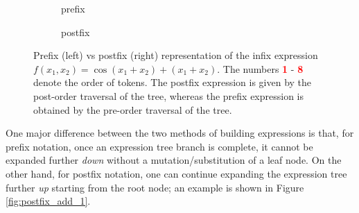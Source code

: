 \documentclass[12pt]{iopart}
\begin{document}
\begin{figure}
    \begin{subfigure}[b]{0.51\textwidth}
        \centering
        \caption{prefix}
        \label{subfig:prefix_tree_example}
    \end{subfigure}
    \hspace{1cm}
    \begin{subfigure}[b]{0.51\textwidth}
        \centering
        \caption{postfix} \label{subfig:postfix_tree_example}
    \end{subfigure}
    \caption{Prefix (left) vs postfix (right) representation of the infix expression $f(x_1, x_2) = \cos(x_1 + x_2) + (x_1 + x_2)$. The numbers \textcolor{red}{\textbf{1}} - \textcolor{red}{\textbf{8}} denote the order of tokens. The postfix expression is given by the post-order traversal of the tree, whereas the prefix expression is obtained by the pre-order traversal of the tree.}
    \label{fig:prefix_vs_postfix}
\end{figure}

\par One major difference between the two methods of building expressions is that, for prefix notation, once an expression tree branch is complete, it cannot be expanded further \emph{down} without a mutation/substitution of a leaf node. On the other hand, for postfix notation, one can continue expanding the expression tree further \emph{up} starting from the root node; an example is shown in Figure \ref{fig:postfix_add_1}.
\end{document}
